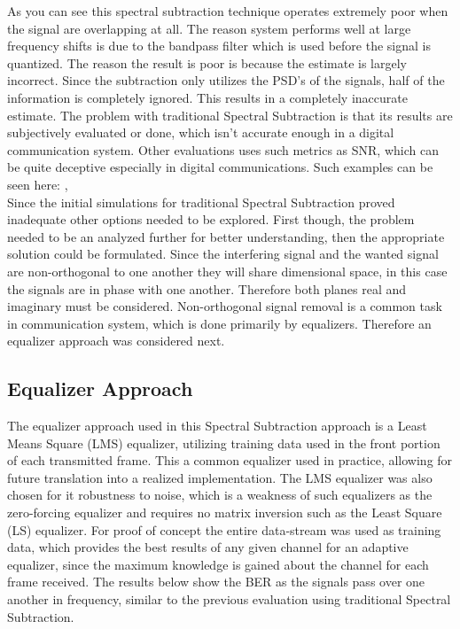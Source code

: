 As you can see this spectral subtraction technique operates extremely poor when the signal are overlapping at all.  The reason system performs well at large frequency shifts is due to the bandpass filter which is used before the signal is quantized.  The reason the result is poor is because the estimate is largely incorrect.  Since the subtraction only utilizes the PSD's of the signals, half of the information is completely ignored.  This results in a completely inaccurate estimate.  The problem with traditional Spectral Subtraction is that its results are subjectively evaluated or done, which isn't accurate enough in a digital communication system.  Other evaluations uses such metrics as SNR, which can be quite deceptive especially in digital communications.  Such examples can be seen here: \cite{ss_subjective1}, \cite{ss_subjective2} \\

Since the initial simulations for traditional Spectral Subtraction proved inadequate other options needed to be explored.  First though, the problem needed to be an analyzed further for better understanding, then the appropriate solution could be formulated.  Since the interfering signal and the wanted signal are non-orthogonal to one another they will share dimensional space, in this case the signals are in phase with one another.  Therefore both planes real and imaginary must be considered.  Non-orthogonal signal removal is a common task in communication system, which is done primarily by equalizers.  Therefore an equalizer approach was considered next.\\

\subsection{Equalizer Approach}

The equalizer approach used in this Spectral Subtraction approach is a Least Means Square (LMS) equalizer, utilizing training data used in the front portion of each transmitted frame.  This a common equalizer used in practice, allowing for future translation into a realized implementation.  The LMS equalizer was also chosen for it robustness to noise, which is a weakness of such equalizers as the zero-forcing equalizer and requires no matrix inversion such as the Least Square (LS) equalizer.  For proof of concept the entire data-stream was used as training data, which provides the best results of any given channel for an adaptive equalizer, since the maximum knowledge is gained about the channel for each frame received.  The results below show the BER as the signals pass over one another in frequency, similar to the previous evaluation using traditional Spectral Subtraction.\\
  
